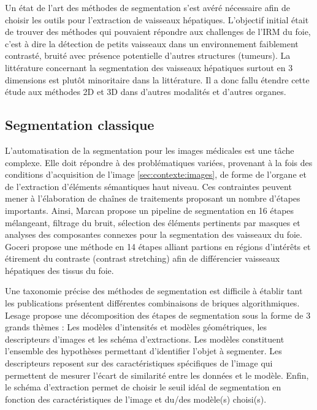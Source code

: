 Un état de l'art des méthodes de segmentation s'est avéré nécessaire afin de choisir les outils pour l'extraction de vaisseaux hépatiques. L'objectif initial était de trouver des méthodes qui pouvaient répondre aux challenges de l'IRM du foie, c'est à dire la détection de petits vaisseaux dans un environnement faiblement contrasté, bruité avec présence potentielle d'autres structures (tumeurs). La littérature concernant la segmentation des vaisseaux hépatiques surtout en 3 dimensions est plutôt minoritaire dans la littérature. Il a donc fallu étendre cette étude aux méthodes 2D et 3D dans d'autres modalités et d'autres organes.

\subsection{Segmentation classique}
\label{sec:EA:segmentation_classique}
% 
L'automatisation de la segmentation pour les images médicales est une tâche complexe. Elle doit répondre à des problématiques variées, provenant à la fois des conditions d'acquisition de l'image \ref{sec:contexte:images}, de forme de l'organe et de l'extraction d'éléments sémantiques haut niveau. Ces contraintes peuvent mener à l'élaboration de chaînes de traitements proposant un nombre d'étapes importants. Ainsi, Marcan \cite{Marcan2014_vessel_seg} propose un pipeline de segmentation en 16 étapes mélangeant, filtrage du bruit, sélection des éléments pertinents par masques et analyses des composantes connexes pour la segmentation des vaisseaux du foie. Goceri \cite{Goceri2017_vessel} propose une méthode en 14 étapes alliant partions en régions d'intérêts et étirement du contraste (contrast stretching) afin de différencier vaisseaux hépatiques des tissus du foie.

Une taxonomie précise des méthodes de segmentation est difficile à établir tant les publications présentent différentes combinaisons de briques algorithmiques. Lesage \cite{Lesage2009_review} propose une décomposition des étapes de segmentation sous la forme de 3 grands thèmes : Les modèles d'intensités et modèles géométriques, les descripteurs d'images et les schéma d'extractions. Les modèles constituent l'ensemble des hypothèses permettant d'identifier l'objet à segmenter. Les descripteurs reposent sur des caractéristiques spécifiques de l'image qui permettent de mesurer l'écart de similarité entre les données et le modèle. Enfin, le schéma d'extraction permet de choisir le seuil idéal de segmentation en fonction des caractéristiques de l'image et du/des modèle(s) choisi(s).

